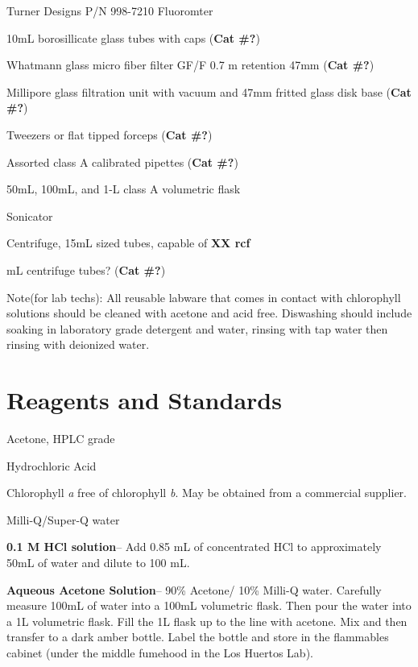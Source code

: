 \documentclass[12pt]{../SOP3_alpha}
\begin{document}
\NP Turner Designs P/N 998-7210 Fluoromter

\NP 10mL borosillicate glass tubes with caps (\textbf{Cat \#?})

\NP Whatmann glass micro fiber filter GF/F 0.7 \micro m retention 47mm (\textbf{Cat \#?})

\NP Millipore glass filtration unit with vacuum and 47mm fritted glass disk base (\textbf{Cat \#?})

\NP Tweezers or flat tipped forceps (\textbf{Cat \#?})

\NP Assorted class A calibrated pipettes (\textbf{Cat \#?})

\NP 50mL, 100mL, and 1-L class A volumetric flask

\NP Sonicator %

\NP Centrifuge, 15mL sized tubes, capable of \textbf{XX rcf}

 mL centrifuge tubes? (\textbf{Cat \#?})%


\NP Note(for lab techs): All reusable labware that comes in contact with chlorophyll solutions should be cleaned with acetone and acid free. Diswashing should include soaking in laboratory grade detergent and water, rinsing with tap water then rinsing with deionized water. 

\section{Reagents and Standards}
\NP Acetone, HPLC grade

\NP Hydrochloric Acid

\NP Chlorophyll \textit{a} free of chlorophyll \textit{b}. May be obtained from a commercial supplier.

\NP Milli-Q/Super-Q water

\NP \textbf{0.1 M HCl solution}-- Add 0.85 mL of concentrated HCl to approximately 50mL of water and dilute to 100 mL. 

\NP \textbf{Aqueous Acetone Solution}-- 90\% Acetone/ 10\% Milli-Q water. Carefully measure 100mL of water into a 100mL volumetric flask. Then pour the water into a 1L volumetric flask. Fill the 1L flask up to the line with acetone. Mix and then transfer to a dark amber bottle. Label the bottle and store in the flammables cabinet (under the middle fumehood in the Los Huertos Lab). 
\end{document}
